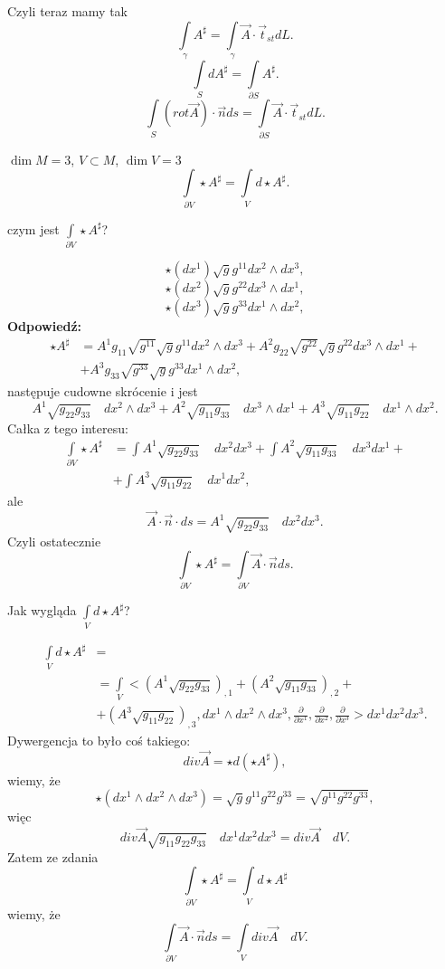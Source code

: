 \documentclass[../main.tex]{subfiles}
\begin{document}
Czyli teraz mamy tak
\[
    \int\limits_\gamma A^\sharp = \int\limits_\gamma \vec{A}\cdot \vec{t}_{st}dL
.\]
\[
\int\limits_S dA^\sharp = \int\limits_{\partial S}A^\sharp
.\]
\[
    \int\limits_S\left( rot \vec{A} \right) \cdot \vec{n} ds = \int\limits_{\partial S}\vec{A} \cdot \vec{t}_{st}dL
.\]
\begin{przyklad}
    $\dim M = 3$, $V \subset M$, $\dim V = 3$
     \[
    \int\limits_{\partial V}\star A^\sharp = \int\limits_V d\star A^\sharp
    .\]
\end{przyklad}
\begin{pytanie}
czym jest $\int\limits_{\partial V}\star A^\sharp$?
\end{pytanie}
\[
    \star(dx^{1})\sqrt{g}g^{11}  dx^{2}\land dx^{3}
,\]
\[
    \star(dx^{2})\sqrt{g}g^{22}  dx^{3}\land dx^{1}
,\]
\[
    \star(dx^{3})\sqrt{g}g^{33}  dx^{1}\land dx^{2}
,\]
\textbf{Odpowiedź:}
\begin{align*}
    \star A^\sharp &= A^1g_{11}\sqrt{g^{11}} \sqrt{g} g^{11}dx^{2} \land dx^{3} + A^2 g_{22}\sqrt{g^{22}} \sqrt{g} g^{22} dx^{3} \land dx^{1} +\\
    &+A^3 g_{33}\sqrt{g^{33}} \sqrt{g} g^{33}dx^{1} \land dx^{2}
,\end{align*}
następuje cudowne skrócenie i jest
\[
A^1 \sqrt{g_{22}g_{33}}\quad dx^{2} \land dx^{3}  + A^2 \sqrt{g_{11}g_{33}} \quad dx^{3} \land dx^{1} + A^3 \sqrt{g_{11}g_{22}} \quad dx^{1} \land dx^{2}
.\]
Całka z tego interesu:
\begin{align*}
    \int\limits_{\partial V}\star A^\sharp &= \int\limits A^1 \sqrt{g_{22}g_{33}}\quad dx^{2} dx^{3} + \int\limits A^2 \sqrt{g_{11}g_{33}}\quad dx^{3} dx^{1} + \\
&+ \int\limits A^3 \sqrt{g_{11}g_{22}} \quad dx^{1}  dx^{2}
,\end{align*}
ale
\[
    \vec{A}\cdot \vec{n}\cdot ds = A^1 \sqrt{g_{22}g_{33}}\quad dx^{2} dx^{3}
.\]
Czyli ostatecznie
\[
    \int\limits_{\partial V}\star A^\sharp = \int\limits_{\partial V}\vec{A}\cdot \vec{n}ds
.\]
\begin{pytanie}
Jak wygląda $\int\limits_Vd\star A^\sharp$?
\end{pytanie}
\begin{align*}
    \int\limits_{V}d\star A^\sharp &=\\
    &= \int\limits_{V} \Bigg< \left( A^1\sqrt{g_{22}g_{33}} \right)_{,1} + \left( A^2\sqrt{g_{11}g_{33}}  \right) _{,2} +\\
    &+ \left( A^3\sqrt{g_{11}g_{22}}  \right) _{,3}, dx^{1} \land dx^{2} \land dx^{3} , \frac{\partial }{\partial x^1} , \frac{\partial }{\partial x^2} , \frac{\partial }{\partial x^3} \Bigg> dx^{1} dx^{2} dx^{3}
.\end{align*}
Dywergencja to było coś takiego:
\[
    div \vec{A} = \star d\left( \star A^\sharp \right)
,\]
wiemy, że
\[
    \star\left( dx^{1} \land dx^{2} \land dx^{3}  \right) = \sqrt{g} g^{11}g^{22}g^{33} = \sqrt{g^{11}g^{22}g^{33}}
,\]
więc
\[
    div \vec{A} \sqrt{g_{11}g_{22}g_{33}}\quad dx^{1} dx^{2} dx^{3}= div\vec{A}\quad dV
.\]
Zatem ze zdania
\[
\int\limits_{\partial V}\star A^\sharp = \int\limits_V d\star A^\sharp
\]
wiemy, że
\[
    \int\limits_{\partial V}\vec{A}\cdot \vec{n} ds = \int\limits_V div \vec{A} \quad dV
.\]
\end{document}
